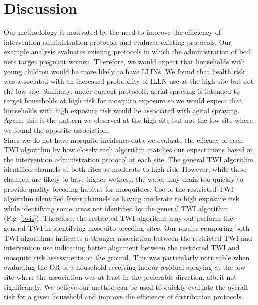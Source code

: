 \documentclass[10pt,letterpaper]{article}\usepackage[]{graphicx}\usepackage[]{color}
\begin{document}
\section*{Discussion}
Our methodology is motivated by the need to improve the efficiency of intervention administration protocols and evaluate existing protocols.  Our example analysis evaluates existing protocols in which the administration of bed nets target pregnant women.  Therefore,  we would expect that households with young children would be more likely to have LLINs.  We found that health risk was associated with an increased probability of ILLN use at the high site but not the low site.  Similarly, under current protocols, aerial spraying is intended to target households at high risk for mosquito exposure  so we would expect that households with high exposure risk would be associated with aerial spraying.  Again,  this is the pattern we observed at the high site but not the low site where we found the opposite association.\\

Since we do not have mosquito incidence data we evaluate the efficacy of each TWI algorithm by how closely each algorithm matches our expectations based on the intervention administration protocol at each site.  The general TWI algorithm identified channels at both sites as moderate to high risk.  However, while these channels are likely to have higher wetness, the water may drain too quickly to provide quality breeding habitat for mosquitoes.  Use of the restricted TWI algorithm identified fewer channels as having moderate to high exposure risk while identifying some areas not identified by the general TWI algorithm (Fig~\ref{twis}).  Therefore, the restricted TWI algorithm may out-perform the general TWI in identifying mosquito breeding sites.  Our results comparing both TWI algorithms indicates a stronger association between the restricted TWI and intervention use indicating better alignment between the restricted TWI and mosquito risk assessments on the ground. This was particularly noticeable when evaluating the OR of a household receiving indoor residual spraying at the low site where the association was at least in the preferable direction, albeit not significantly.  We believe our method can be used to quickly evaluate the overall risk for a given household and improve the efficiency of distribution protocols.\\
\end{document}
